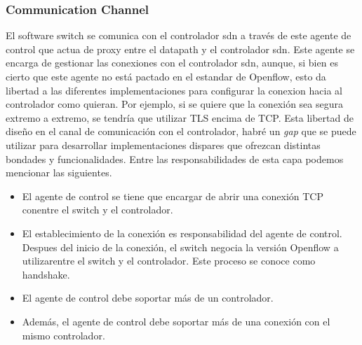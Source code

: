 \subsubsection{Communication Channel}

El software switch se comunica con el controlador \gls{sdn} a través de este agente de control que actua de proxy entre el datapath y el controlador \gls{sdn}. Este agente se encarga de gestionar las conexiones con el controlador \gls{sdn}, aunque, si bien es cierto que este agente no está pactado en el estandar de Openflow, esto da libertad a las diferentes implementaciones para configurar la conexion hacia al controlador como quieran. Por ejemplo, si se quiere que la conexión sea segura extremo a extremo, se tendría que utilizar TLS encima de TCP. Esta libertad de diseño en el canal de comunicación con el controlador, habré un \textit{gap} que se puede utilizar para desarrollar implementaciones dispares que ofrezcan distintas bondades y funcionalidades. Entre las responsabilidades de esta capa podemos mencionar las siguientes.

\begin{itemize}
    \item El agente de control se tiene que encargar de abrir una conexión TCP conentre el switch y el controlador.
    \item El establecimiento de la conexión es responsabilidad del agente de control. Despues del inicio de la conexión, el switch negocia la versión Openflow a utilizarentre el switch y el controlador. Este proceso se conoce como handshake.
    \item El agente de control debe soportar más de un controlador.
    \item Además, el agente de control debe soportar más de una conexión con el mismo controlador.
\end{itemize}